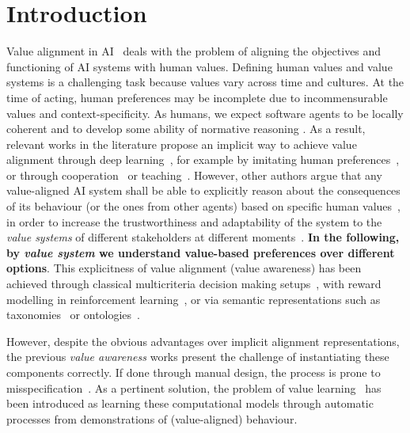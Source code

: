 \documentclass{ecai}
\begin{document}

\section{Introduction}\label{sec:introduction}
Value alignment in AI~\cite{Russell2022alignmentDefinition} deals with the problem of aligning the objectives and functioning of AI systems with human values. Defining human values and value systems is a challenging task because values vary across time and cultures. At the time of acting, human preferences may be incomplete due to incommensurable values and context-specificity. As humans, we expect software agents to be locally coherent and to develop some ability of normative reasoning \cite{zhi2024beyond}. As a result, relevant works in the literature propose an implicit way to achieve value alignment through deep learning~\cite{christiano2023deeprlpreferences,deep}, for example by imitating human preferences~\cite{dpoLLM2023,proportionalityRLHFAggregationChandakGoelPeters2024,trexpreferences2019}, or through cooperation~\cite{hadfieldCIRL} or teaching~\cite{Barnett2023LearningRLTeacher}. However, other authors argue that any value-aligned AI system shall be able to explicitly reason about the consequences of its behaviour (or the ones from other agents) based on specific human values~\cite{valueengineeringAutonomous2023}, in order to increase the trustworthiness and adaptability of the system to the \textit{value systems} of different stakeholders at different moments~\cite{andres2024vecompPaper}. \textbf{In the following, by \textit{value system} we understand value-based preferences over different options}. This explicitness of value alignment (value awareness) has been achieved through classical multicriteria decision making setups~\cite{AaronAgreementTOPSIS,Karanik2024}, with reward modelling in reinforcement learning~\cite{andres2023vae,rodriguez2023reinforcementEthicalEmbedingWeightsRewardRL}, or via semantic representations such as taxonomies~\cite{Osman2024} or ontologies~\cite{andres2024icaart,de2022basicValueNet}. 

However, despite the obvious advantages over implicit alignment representations, the previous \textit{value awareness} works present the challenge of instantiating these components correctly. If done through manual design, the process is prone to misspecification~\cite{Sumers2022InstructionsAndDescriptions}. As a pertinent solution, the problem of value learning~\cite{Soares2018ValueLearningProblem} has been introduced as learning these computational models through automatic processes from demonstrations of (value-aligned) behaviour. 
\end{document}
